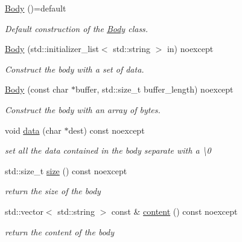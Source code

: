 \begin{DoxyCompactItemize}
\item 
\mbox{\label{classprotocol_1_1serialize_1_1_body_a8bb413cb98248b3f0fd1a38966de0262}} 
\hyperlink{classprotocol_1_1serialize_1_1_body_a8bb413cb98248b3f0fd1a38966de0262}{Body} ()=default
\begin{DoxyCompactList}\small\item\em Default construction of the \hyperlink{classprotocol_1_1serialize_1_1_body}{Body} class. \end{DoxyCompactList}\item 
\hyperlink{classprotocol_1_1serialize_1_1_body_ad7d30dfc067cb9c2cbc5c89821cd6bbe}{Body} (std\+::initializer\+\_\+list$<$ std\+::string $>$ in) noexcept
\begin{DoxyCompactList}\small\item\em Construct the body with a set of data. \end{DoxyCompactList}\item 
\hyperlink{classprotocol_1_1serialize_1_1_body_ae345ba686290c375ded50efc7b4be7e6}{Body} (const char $\ast$buffer, std\+::size\+\_\+t buffer\+\_\+length) noexcept
\begin{DoxyCompactList}\small\item\em Construct the body with an array of bytes. \end{DoxyCompactList}\item 
void \hyperlink{classprotocol_1_1serialize_1_1_body_ab7d3edf03b647b9e5323a697e9a8f7db}{data} (char $\ast$dest) const noexcept
\begin{DoxyCompactList}\small\item\em set all the data contained in the body separate with a \textbackslash{}0 \end{DoxyCompactList}\item 
\mbox{\label{classprotocol_1_1serialize_1_1_body_a57d9877ef6ffa92220f1ca7f3e5b4389}} 
std\+::size\+\_\+t \hyperlink{classprotocol_1_1serialize_1_1_body_a57d9877ef6ffa92220f1ca7f3e5b4389}{size} () const noexcept
\begin{DoxyCompactList}\small\item\em return the size of the body \end{DoxyCompactList}\item 
\mbox{\label{classprotocol_1_1serialize_1_1_body_a88da253a4a941b3e8b9597d43462383b}} 
std\+::vector$<$ std\+::string $>$ const  \& \hyperlink{classprotocol_1_1serialize_1_1_body_a88da253a4a941b3e8b9597d43462383b}{content} () const noexcept
\begin{DoxyCompactList}\small\item\em return the content of the body \end{DoxyCompactList}\end{DoxyCompactItemize}


